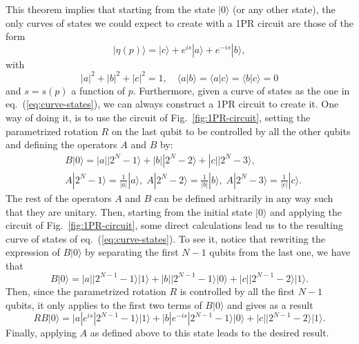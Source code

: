 \documentclass[10pt,letterpaper]{article} %
\newcommand{\fref}[1]{Fig.~\ref{#1}}
\newcommand{\eref}[1]{eq.~(\ref{#1})}
\begin{document}
 
This theorem implies that starting from the state $|0\rangle$ (or any 
other state),
the only curves of states we could expect to create
with a 1PR circuit are those of the form 
\begin{equation}
|\eta(p)\rangle = |c\rangle + e^{is}|a\rangle + e^{-is} |b\rangle,
\label{eq:curve-states}
\end{equation}
with 
\begin{equation}
|a|^2 + |b|^2 + |c|^2 = 1,  \quad
\langle a |b\rangle =
\langle a |c\rangle =
\langle b |c\rangle = 0
\label{eq:conditions-vecs}
\end{equation}
and $s = s(p)$ a function of $p$.
Furthermore, given a curve of states as the one in
\eref{eq:curve-states}, we can always construct a 1PR circuit to create it.
One way of doing it, is to use the circuit of \fref{fig:1PR-circuit}, setting the parametrized
rotation $R$ on the last qubit to be controlled by all the other qubits
and defining the operators $A$ and $B$ by:
\begin{align*}
&B|0\rangle = |a| |2^{N}-1 \rangle + |b| |2^{N}-2\rangle + |c| |2^N-3\rangle, \\
&A|2^N-1 \rangle = \frac{1}{|a|} |a\rangle,\; A|2^{N}-2\rangle = \frac{1}{|b|}|b\rangle, \; A|2^{N}-3\rangle = \frac{1}{|c|}|c\rangle.
\end{align*}
The rest of the operators $A$ and $B$ can be
defined arbitrarily in any way such that they are unitary.
Then, starting from the initial state $|0\rangle$
and applying the circuit  of \fref{fig:1PR-circuit}, 
some direct calculations lead us  to 
the resulting curve of states
of \eref{eq:curve-states}.
To see it, notice that rewriting the expression of  $B|0\rangle$ by separating the
first $N-1$ qubits from the last one,
we have that $$B|0\rangle = |a| |2^{N-1}-1\rangle |1\rangle + |b| |2^{N-1}-1\rangle |0\rangle + |c| |2^{N-1}-2\rangle |1\rangle.$$
Then, since the parametrized rotation $R$ is controlled by all the first $N-1$ qubits, it only applies
to the first two terms of $B|0\rangle$ 
and gives as a result
$$
RB|0\rangle =|a| e^{is} |2^{N-1}-1\rangle |1\rangle + |b| e^{-is} |2^{N-1}-1\rangle |0\rangle + |c| |2^{N-1}-2\rangle |1\rangle.
$$
Finally, applying $A$ as defined above to this state leads to the desired result.
 
\end{document}
